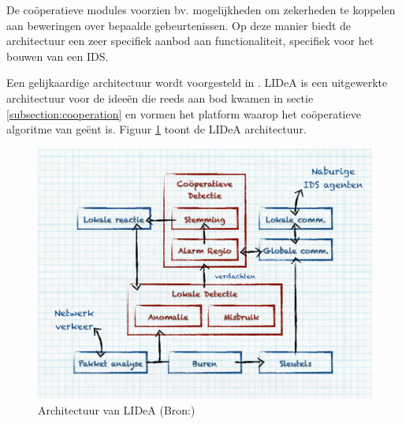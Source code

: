 De co\"operatieve modules voorzien bv. mogelijkheden om zekerheden te koppelen
aan beweringen over bepaalde gebeurtenissen. Op deze manier biedt de
architectuur een zeer specifiek aanbod aan functionaliteit, specifiek voor het
bouwen van een IDS.

Een gelijkaardige architectuur wordt voorgesteld in \citep{krontiris2008lidea}.
LIDeA is een uitgewerkte architectuur voor de idee\"en die reeds aan bod kwamen
in sectie \ref{subsection:cooperation} en vormen het platform waarop het
co\"operatieve algoritme van \citep{krontiris2009cooperative} ge\"ent is.
Figuur \ref{fig:lidea-architecture} toont de LIDeA architectuur.

\begin{figure}[ht]
  \centering
  \includegraphics[width=0.9\linewidth]{resources/lidea-architecture.pdf}
  \caption[Architectuur van LIDeA]{Architectuur van LIDeA (Bron:\citep{krontiris2008lidea})}
  \label{fig:lidea-architecture}
\end{figure}
